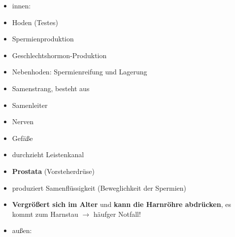 \documentclass{article}
\newcommand\gEs[1]{\textbf{\textcolor[rgb]{0.0,0.0,0.5019608}{#1}}}
\newcommand\gEs[1]{\textbf{\textcolor[rgb]{0.0,0.0,0.5019608}{#1}}}
\begin{document}
\begin{itemize}
\item {\mdseries
innen:}

\end{itemize}
\begin{itemize}
\item {\mdseries
Hoden (Testes)}

\end{itemize}
\begin{itemize}
\item {\mdseries
Spermienproduktion}

\item {\mdseries
Geschlechtshormon-Produktion}

\end{itemize}
\begin{itemize}
\item {\mdseries
Nebenhoden: Spermienreifung und Lagerung}

\item {\mdseries
Samenstrang, besteht aus }

\end{itemize}
\begin{itemize}
\item {\mdseries
Samenleiter}

\item {\mdseries
Nerven}

\item {\mdseries
Gef\"a{\ss}e}

\item {\mdseries
durchzieht Leistenkanal}

\end{itemize}
\begin{itemize}
\item {\mdseries
{}\gEs{Prostata} (Vorsteherdr\"use)}

\end{itemize}
\begin{itemize}
\item {\mdseries
produziert Samenfl\"ussigkeit (Beweglichkeit der Spermien)}

\item {\mdseries
\gEs{Vergr\"o{\ss}ert sich im Alter} und
\gEs{kann die Harnr\"ohre abdr\"ucken}, es kommt zum
Harnstau ${\rightarrow}$ h\"aufger Notfall!}

\end{itemize}
\begin{itemize}
\item {\mdseries
au{\ss}en:}

\end{itemize}
\end{document}
